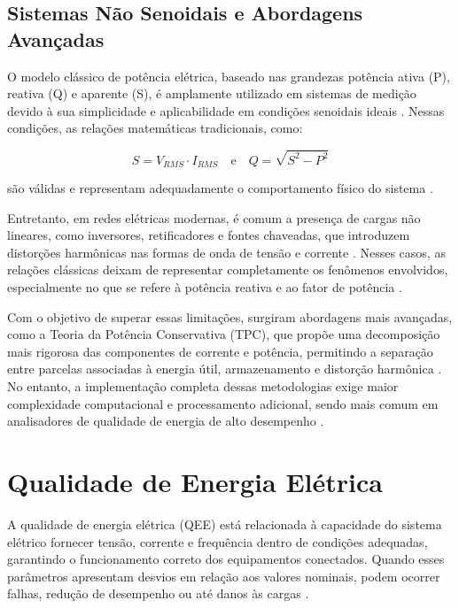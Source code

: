 \subsection{Sistemas Não Senoidais e Abordagens Avançadas}
O modelo clássico de potência elétrica, baseado nas grandezas potência ativa (P), reativa (Q) e aparente (S), é amplamente utilizado em sistemas de medição devido à sua simplicidade e aplicabilidade em condições senoidais ideais \cite{Alexander2013}. Nessas condições, as relações matemáticas tradicionais, como:

\begin{equation}
    S = V_{RMS} \cdot I_{RMS} \quad \text{e} \quad Q = \sqrt{S^{2} - P^{2}}
\end{equation}

são válidas e representam adequadamente o comportamento físico do sistema \cite{IEEE2010, Alexander2013}. 

Entretanto, em redes elétricas modernas, é comum a presença de cargas não lineares, como inversores, retificadores e fontes chaveadas, que introduzem distorções harmônicas nas formas de onda de tensão e corrente \cite{Dugan2012}. Nesses casos, as relações clássicas deixam de representar completamente os fenômenos envolvidos, especialmente no que se refere à potência reativa e ao fator de potência \cite{IEEE2010, Akagi2007}.

Com o objetivo de superar essas limitações, surgiram abordagens mais avançadas, como a Teoria da Potência Conservativa (TPC), que propõe uma decomposição mais rigorosa das componentes de corrente e potência, permitindo a separação entre parcelas associadas à energia útil, armazenamento e distorção harmônica \cite{Tenti2011, Paredes2012}. No entanto, a implementação completa dessas metodologias exige maior complexidade computacional e processamento adicional, sendo mais comum em analisadores de qualidade de energia de alto desempenho \cite{Tenti2011}.

\section{Qualidade de Energia Elétrica}
A qualidade de energia elétrica (QEE) está relacionada à capacidade do sistema elétrico fornecer tensão, corrente e frequência dentro de condições adequadas, garantindo o funcionamento correto dos equipamentos conectados. Quando esses parâmetros apresentam desvios em relação aos valores nominais, podem ocorrer falhas, redução de desempenho ou até danos às cargas \cite{Filho2010}.

